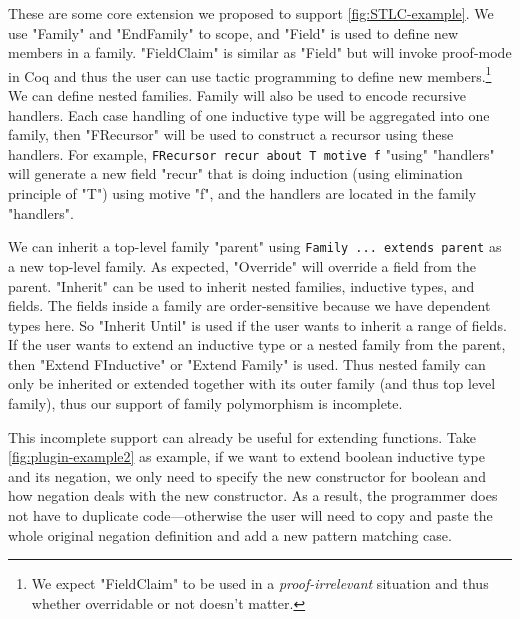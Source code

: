 These are some core extension we proposed to support \cref{fig:STLC-example}. We use "Family" and "EndFamily" to scope, and "Field" is used to define new members in a family. "FieldClaim" is similar as "Field" but will invoke proof-mode in Coq and thus the user can use tactic programming to define new members.\footnote{We expect "FieldClaim" to be used in a \textit{proof-irrelevant} situation and thus whether overridable or not doesn't matter.}
We can define nested families.
Family will also be used to encode recursive handlers. Each case
handling of one inductive type will be aggregated into one family, then
"FRecursor" will be used to construct a recursor using these handlers.
For example, \texttt{FRecursor recur about T motive f} "using"
"handlers" will generate a new field "recur" that is doing induction
(using elimination principle of "T") using motive "f", and the handlers
are located in the family "handlers".

We can inherit a top-level family "parent" using \texttt{Family
... extends parent} as a new top-level family. As expected, "Override"
will override a field from the parent. "Inherit" can be used to inherit
nested families, inductive types, and fields. The fields inside a family
are order-sensitive because we have dependent types here. So "Inherit
Until" is used if the user wants to inherit a range of fields. If the
user wants to extend an inductive type or a nested family from the
parent, then "Extend FInductive" or "Extend Family" is used. Thus nested
family can only be inherited or extended together with its outer family
(and thus top level family), thus our support of family polymorphism is
incomplete.

This incomplete support can already be useful for extending functions.
Take \cref{fig:plugin-example2} as example, if we want to extend boolean
inductive type and its negation, we only need to specify the new
constructor for boolean and how negation deals with the new constructor.
As a result, the programmer does not have to duplicate code---otherwise
the user will need to copy and paste the whole original negation
definition and add a new pattern matching case.
